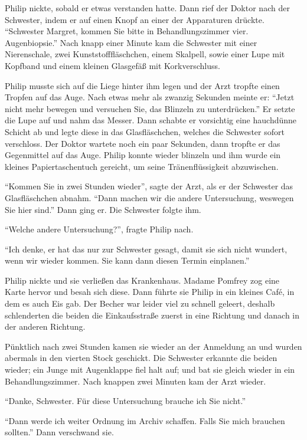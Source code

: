 Philip nickte, sobald er etwas verstanden hatte. Dann rief der Doktor nach der Schwester, indem er auf einen Knopf an einer der Apparaturen drückte. \enquote{Schwester Margret, kommen Sie bitte in Behandlungszimmer vier. Augenbiopsie.} Nach knapp einer Minute kam die Schwester mit einer Nierenschale, zwei Kunststofffläschchen, einem Skalpell, sowie einer Lupe mit Kopfband und einem kleinen Glasgefäß mit Korkverschluss.

Philip musste sich auf die Liege hinter ihm legen und der Arzt tropfte einen Tropfen auf das Auge. Nach etwas mehr als zwanzig Sekunden meinte er: \enquote{Jetzt nicht mehr bewegen und versuchen Sie, das Blinzeln zu unterdrücken.} Er setzte die Lupe auf und nahm das Messer. Dann schabte er vorsichtig eine hauchdünne Schicht ab und legte diese in das Glasfläschchen, welches die Schwester sofort verschloss. Der Doktor wartete noch ein paar Sekunden, dann tropfte er das Gegenmittel auf das Auge. Philip konnte wieder blinzeln und ihm wurde ein kleines Papiertaschentuch gereicht, um seine Tränenflüssigkeit abzuwischen.

\enquote{Kommen Sie in zwei Stunden wieder}, sagte der Arzt, als er der Schwester das Glasfläschchen abnahm. \enquote{Dann machen wir die andere Untersuchung, weswegen Sie hier sind.} Dann ging er. Die Schwester folgte ihm.

\enquote{Welche andere Untersuchung?}, fragte Philip nach.

\enquote{Ich denke, er hat das nur zur Schwester gesagt, damit sie sich nicht wundert, wenn wir wieder kommen. Sie kann dann diesen Termin einplanen.}

Philip nickte und sie verließen das Krankenhaus. Madame Pomfrey zog eine Karte hervor und besah sich diese. Dann führte sie Philip in ein kleines Café, in dem es auch Eis gab. Der Becher war leider viel zu schnell geleert, deshalb schlenderten die beiden die Einkaufsstraße zuerst in eine Richtung und danach in der anderen Richtung.

Pünktlich nach zwei Stunden kamen sie wieder an der Anmeldung an und wurden abermals in den vierten Stock geschickt. Die Schwester erkannte die beiden wieder; ein Junge mit Augenklappe fiel halt auf; und bat sie gleich wieder in ein Behandlungszimmer. Nach knappen zwei Minuten kam der Arzt wieder.

\enquote{Danke, Schwester. Für diese Untersuchung brauche ich Sie nicht.}

\enquote{Dann werde ich weiter Ordnung im Archiv schaffen. Falls Sie mich brauchen sollten.} Dann verschwand sie.


